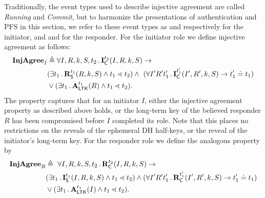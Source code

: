 Traditionally, the event types used to describe injective agreement are called
\emph{Running} and \emph{Commit}, but to harmonize the presentations of
authentication and PFS in this section, we refer to these event types as
\mIStart{} and \mIComplete{} respectively for the initiator, and
\mRStart{} and \mRComplete{} for the responder.
%
For the initiator role we define injective agreement as follows:
\begin{align*}
    \mathbf{InjAgree}_I& \triangleq
    \forall I, R, k, S, t_2\operatorname{.} \mathbf{I}_{\textsf{C}}^{t_2}(I, R, k, S)
    \rightarrow\\
    &(\exists t_1\operatorname{.} \mathbf{R}_{\textsf{S}}^{t_1}(R, k, S) \land t_1 \lessdot t_2)
    \land\ (\forall I' R' t_1' \operatorname{.} \mathbf{I}_{\textsf{C}}^{t_1'}(I' , R', k, S)
        \rightarrow t_1' \doteq t_1) \\
    &\lor(\exists t_1\operatorname{.} \mathbf{A}_{\textsf{LTK}}^{t_1}(R) \land t_1 \lessdot t_2).
\end{align*}
%
The property captures that for an initiator $I$, either the injective agreement
property as described above holds, or the long-term key of the believed
responder $R$ has been compromised before $I$ completed its role.
%
Note that this places no restrictions on the reveals of the ephemeral
DH half-keys, or the reveal of the initiator's long-term key.
%
For the responder role we define the analogous property by
\begin{align*}
    \mathbf{InjAgree}_R& \triangleq\
    \forall I, R, k, S, t_2\operatorname{.} \mathbf{R}_{\textsf{C}}^{t_2}(I, R, k, S)
    \rightarrow\\
    &(\exists t_1\operatorname{.} \mathbf{I}_{\textsf{S}}^{t_1}(I, R, k, S) \land t_1 \lessdot t_2)
    \land (\forall I' R' t_1' \operatorname{.} \mathbf{R}_{\textsf{C}}^{t_1'}(I' , R', k, S)
        \rightarrow t_1' \doteq t_1)\\
    &\lor(\exists t_1\operatorname{.} \mathbf{A}_{\textsf{LTK}}^{t_1}(I) \land t_1 \lessdot t_2).
\end{align*}
%

